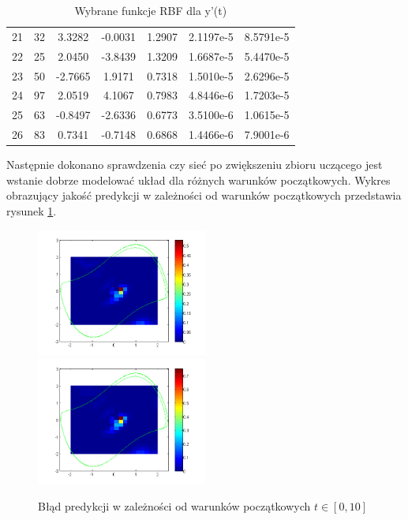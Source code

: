 \begin{table}[ht!]
\begin{tabular}{ |c| c| c| c| c| c| c| }
   21 &  32 &   3.3282  & -0.0031  &  1.2907  &  2.1197e-5 & 8.5791e-5   \\
   22 &  25 &   2.0450  & -3.8439  &  1.3209  &  1.6687e-5 & 5.4470e-5   \\
   23 &  50 &  -2.7665  &  1.9171  &  0.7318  &  1.5010e-5 & 2.6296e-5   \\
   24 &  97 &   2.0519  &  4.1067  &  0.7983  &  4.8446e-6 & 1.7203e-5   \\
   25 &  63 &  -0.8497  & -2.6336  &  0.6773  &  3.5100e-6 & 1.0615e-5   \\
   26 &  83 &   0.7341  & -0.7148  &  0.6868  &  1.4466e-6 & 7.9001e-6   \\
   \hline
\end{tabular}

\caption{Wybrane funkcje RBF dla y'(t)}
\label{tab:rbf_tabela2_x2}
\end{table}

\clearpage
 Następnie dokonano sprawdzenia czy sieć po zwiększeniu zbioru uczącego jest wstanie dobrze modelować układ dla różnych warunków początkowych. Wykres obrazujący jakość predykcji w zależności od warunków początkowych przedstawia rysunek \ref{img:err_initial2}.


\begin{figure}[ht!]
	\centering

	\subfloat
	{\includegraphics[width=0.5\textwidth]
	{images/figure_signal2.png}}
	\subfloat
	{\includegraphics[width=0.5\textwidth]
	{images/figure_deriv2.png}}	
	

	\caption{Błąd predykcji w zależności od warunków początkowych $t \in [0,10]$}
	\label{img:err_initial2}
\end{figure}

